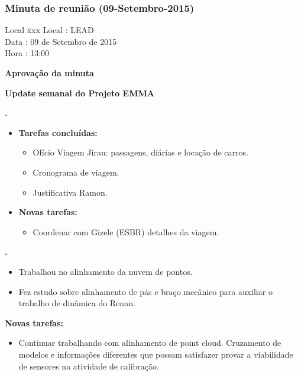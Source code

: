 \subsubsection{Minuta de reunião (09-Setembro-2015)}

\begin{tabbing}
  Local \= xxx \kill
  Local \> : LEAD \\
  Data  \> : 09 de Setembro de 2015 \\
  Hora  \> : 13:00
\end{tabbing}


\textbf{Aprovação da minuta}

\textbf{Update semanal do Projeto EMMA}
   							
\textbf{\alana.} 
	\begin{itemize}
		\item \textbf{Tarefas concluídas:}
			\begin{itemize}    
				\item Ofício Viagem Jirau: passagens, diárias e locação de carros.
				\item Cronograma de viagem.
				\item Justificativa Ramon.
			\end{itemize}
		
		\item \textbf{Novas tarefas:}
			\begin{itemize} 
				\item Coordenar com Gizele (ESBR) detalhes da viagem.
			\end{itemize}
	\end{itemize}   		
						
\textbf{\gabriel.} 
	\begin{itemize}
			\item Trabalhou no alinhamento da nuvem de pontos.
			\item Fez estudo sobre alinhamento de pás e braço mecânico para auxiliar o
			trabalho de dinâmica do Renan.
			\end{itemize}
		
		\item \textbf{Novas tarefas:}
			\begin{itemize} 
				\item Continuar trabalhando com alinhamento de point cloud. Cruzamento de
				modelos e informações diferentes que possam satisfazer provar a viabilidade
				de sensores na atividade de calibração.
			\end{itemize}


